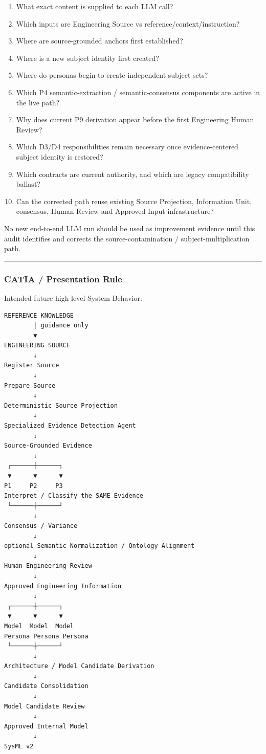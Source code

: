 \begin{enumerate}
\def\labelenumi{\arabic{enumi}.}
\tightlist
\item
  What exact content is supplied to each LLM call?
\item
  Which inputs are Engineering Source vs reference/context/instruction?
\item
  Where are source-grounded anchors first established?
\item
  Where is a new subject identity first created?
\item
  Where do personas begin to create independent subject sets?
\item
  Which P4 semantic-extraction / semantic-consensus components are active in the live path?
\item
  Why does current P9 derivation appear before the first Engineering Human Review?
\item
  Which D3/D4 responsibilities remain necessary once evidence-centered subject identity is restored?
\item
  Which contracts are current authority, and which are legacy compatibility ballast?
\item
  Can the corrected path reuse existing Source Projection, Information Unit, consensus, Human Review and Approved Input infrastructure?
\end{enumerate}

No new end-to-end LLM run should be used as improvement evidence until this audit identifies and corrects the source-contamination / subject-multiplication path.

\begin{center}\rule{0.5\linewidth}{0.5pt}\end{center}

\hypertarget{catia--presentation-rule}{%
\subsubsection{CATIA / Presentation Rule}\label{catia--presentation-rule}}

Intended future high-level System Behavior:

\begin{verbatim}
REFERENCE KNOWLEDGE
        │ guidance only
        ▼
ENGINEERING SOURCE
        ↓
Register Source
        ↓
Prepare Source
        ↓
Deterministic Source Projection
        ↓
Specialized Evidence Detection Agent
        ↓
Source-Grounded Evidence
        ↓
 ┌──────┼──────┐
 ▼      ▼      ▼
P1     P2     P3
Interpret / Classify the SAME Evidence
 └──────┼──────┘
        ↓
Consensus / Variance
        ↓
optional Semantic Normalization / Ontology Alignment
        ↓
Human Engineering Review
        ↓
Approved Engineering Information
        ↓
 ┌──────┼──────┐
 ▼      ▼      ▼
Model  Model  Model
Persona Persona Persona
 └──────┼──────┘
        ↓
Architecture / Model Candidate Derivation
        ↓
Candidate Consolidation
        ↓
Model Candidate Review
        ↓
Approved Internal Model
        ↓
SysML v2
\end{verbatim}

